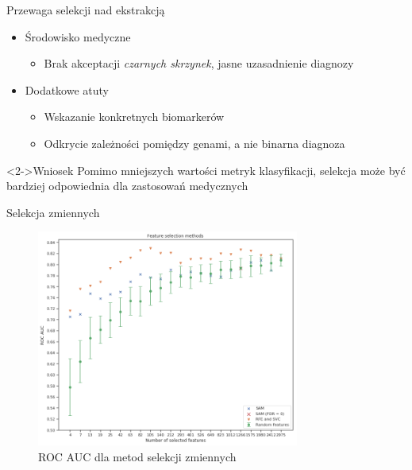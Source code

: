 \documentclass[11pt]{beamer}
\begin{document}
\begin{frame}{Przewaga selekcji nad ekstrakcją}

\begin{itemize}
    \item Środowisko medyczne
    \begin{itemize}
        \item Brak akceptacji \textit{czarnych skrzynek}, jasne uzasadnienie diagnozy
    \end{itemize}
    \item Dodatkowe atuty
    \begin{itemize}
        \item Wskazanie konkretnych biomarkerów
        \item Odkrycie zależności pomiędzy genami, a nie binarna diagnoza
    \end{itemize}
\end{itemize}

\begin{block}<2->{Wniosek}
    Pomimo mniejszych wartości metryk klasyfikacji, selekcja może być bardziej odpowiednia dla zastosowań medycznych
\end{block}
    
\end{frame}

\begin{frame}{Selekcja zmiennych}
\begin{figure}
\centering
\includegraphics[width=0.77\textwidth]{images/selection-scores.png}
\caption{ROC AUC dla metod selekcji zmiennych}
\end{figure}
    
\end{frame}
\end{document}
